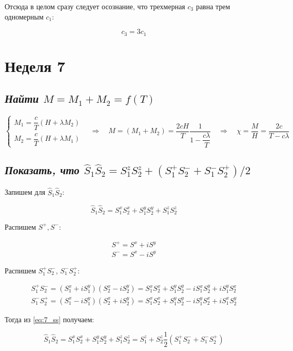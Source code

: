 \documentclass[a4paper, 12pt]{article}
\newcommand{\qrq}
{\ensuremath{\quad \Rightarrow \quad}} %
\begin{document}
Отсюда в целом сразу следует осознание, что трехмерная $c_3$ равна трем одномерным $c_1$:

\begin{equation}
	c_3 = 3 c_1
\end{equation} 

\newpage

\section{Неделя 7}

\subsection{\textit{Найти $M = M_1 + M_2 = f(T)$}}

\begin{equation}
	\begin{cases*}
		M_1 = \dfrac{c}{T}(H + \lambda M_2)\\
		M_2 = \dfrac{c}{T}(H + \lambda M_1)
	\end{cases*}
	\qrq M = (M_1 + M_2) = \frac{2 c H}{T} \frac{1}{1 - \dfrac{c\lambda}{T}} \qrq \chi = \frac{M}{H} = \frac{2c}{T - c\lambda}
\end{equation}

\subsection{\textit{Показать, что $\hat{S}_1 \hat{S}_2 = S_1^z S_2^z + (S_1^+S_2^- + S_1^-S_2^+)/2$}}

Запишем для $\hat{S}_1 \hat{S}_2$:

\begin{equation}
	\hat{S}_1 \hat{S}_2 = S_1^x S_2^x + S_1^y S_2^y + S_1^z S_2^z
	\label{eq:7_ss}
\end{equation}

Распишем $S^+, S^-$:

\begin{align}
	S^+ = S^x + i S^y\\
	S^- = S^x - i S^y
\end{align}

Распишем $S_1^+S_2^-$, $S_1^-S_2^+$:

\begin{align}
	S_1^+S_2^- = (S_1^x + iS_1^y)(S_2^x - iS_2^y) = S_1^x S_2^x + S_1^yS_2^y - i S_1^x S_2^y + i S_1^y S_2^x\\
	S_1^-S_2^+ = (S_1^x - iS_1^y)(S_2^x + iS_2^y) = S_1^x S_2^x + S_1^yS_2^y - i S_1^y S_2^x + i S_1^x S_2^y
\end{align}

Тогда из \ref{eq:7_ss} получаем:

\begin{equation}
	\hat{S}_1 \hat{S}_2 = S_1^x S_2^x + S_1^y S_2^y + S_1^z S_2^z = S_1^z + S_2^z  \frac{1}{2} (S_1^+S_2^- + S_1^-S_2^+)
\end{equation}
\end{document}
